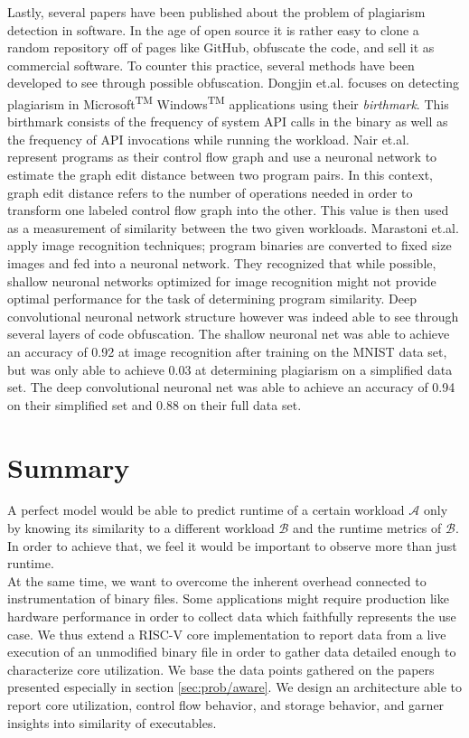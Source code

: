 \documentclass[../bachelor_paper.tex]{subfiles}
\begin{document}
Lastly, several papers have been published about the problem of plagiarism detection in software. In the age of open source it is rather easy to clone a random repository off of pages like GitHub, obfuscate the code, and sell it as commercial software. To counter this practice, several methods have been developed to see through possible obfuscation. Dongjin et.al. \cite{kimMeasuringSimilarityWindows2013} focuses on detecting plagiarism in Microsoft\textsuperscript{TM} Windows\textsuperscript{TM} applications using their \emph{birthmark}. This birthmark consists of the frequency of system \acs{API} calls in the binary as well as the frequency of \acs{API} invocations while running the workload. Nair et.al. \cite{nairFuncGNNGraphNeural2020} represent programs as their control flow graph and use a neuronal network to estimate the graph edit distance between two program pairs. In this context, graph edit distance refers to the number of operations needed in order to transform one labeled control flow graph into the other. This value is then used as a measurement of similarity between the two given workloads. Marastoni et.al. \cite{marastoniDeepLearningApproach2018} apply image recognition techniques; program binaries are converted to fixed size images and fed into a neuronal network. They recognized that while possible, shallow neuronal networks optimized for image recognition might not provide optimal performance for the task of determining program similarity. Deep convolutional neuronal network structure however was indeed able to see through several layers of code obfuscation. The shallow neuronal net was able to achieve an accuracy of 0.92 at image recognition after training on the MNIST data set, but was only able to achieve 0.03 at determining plagiarism on a simplified data set. The deep convolutional neuronal net was able to achieve an accuracy of 0.94 on their simplified set and 0.88 on their full data set.

\section{Summary}
	\label{ch:theo/simi/summ}
A perfect model would be able to predict runtime of a certain workload $\mathcal{A}$ only by knowing its similarity to a different workload $\mathcal{B}$ and the runtime metrics of $\mathcal{B}$. In order to achieve that, we feel it would be important to observe more than just runtime.\\
At the same time, we want to overcome the inherent overhead connected to instrumentation of binary files. Some applications might require production like hardware performance in order to collect data which faithfully represents the use case. We thus extend a RISC-V core implementation to report data from a live execution of an unmodified binary file in order to gather data detailed enough to characterize core utilization. We base the data points gathered on the papers presented especially in section \ref{sec:prob/aware}. We design an architecture able to report core utilization, control flow behavior, and storage behavior, and garner insights into similarity of executables.



\isstandalone



\fi
\end{document}
